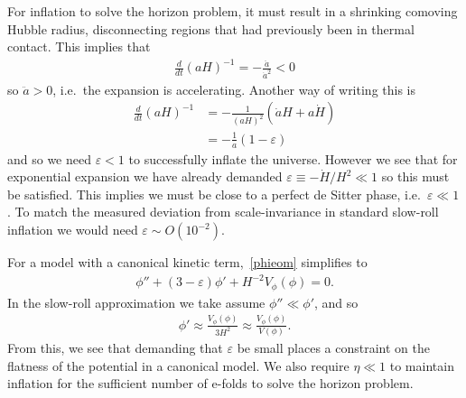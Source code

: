     For inflation to solve the horizon problem, it must result in a shrinking comoving
    Hubble radius, disconnecting regions that had previously been in thermal contact.
    This implies that
    \begin{align}
        \frac{d}{dt}\left(aH\right)^{-1} = -\frac{\ddot{a}}{\dot{a}^2} < 0
    \end{align}
    so $\ddot{a}>0$, i.e.\ the expansion is accelerating. Another way of writing this is
    \begin{align}
        \frac{d}{dt}\left(aH\right)^{-1} &= -\frac{1}{(aH)^2}\left(\dot{a}H+a\dot{H}\right)\\
            &= -\frac{1}{a}\left(1-\varepsilon\right)
    \end{align}
    and so we need $\varepsilon<1$ to successfully inflate the universe.
    However we see that for exponential expansion we have already demanded
    $\varepsilon\equiv-\dot{H}/H^2\ll1$ so this must be satisfied.
    This implies we must be close to a perfect de Sitter phase, i.e.\ $\varepsilon\ll1$.
    To match the measured deviation from scale-invariance in standard slow-roll
    inflation we would need $\varepsilon\sim O(10^{-2})$.


For a model with a canonical kinetic term,~\eqref{phieom} simplifies
to
\begin{align}
    \phi''+(3-\varepsilon)\phi'+H^{-2}V_{\phi}(\phi)=0.
\end{align}
In the slow-roll approximation we take assume $\phi''\ll\phi'$,
and so
\begin{align}
    \phi'\approx\frac{V_{\phi}(\phi)}{3H^2}\approx\frac{V_{\phi}(\phi)}{V(\phi)}.
\end{align}
From this, we see that demanding that $\varepsilon$ be small places a constraint
on the flatness of the potential in a canonical model.
We also require $\eta\ll1$ to maintain inflation for the sufficient number
of e-folds to solve the horizon problem.




